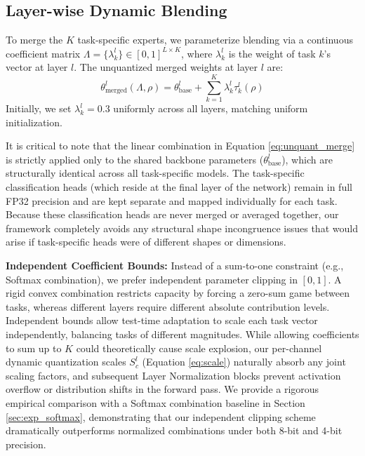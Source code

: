\subsection{Layer-wise Dynamic Blending}
To merge the $K$ task-specific experts, we parameterize blending via a continuous coefficient matrix $\Lambda = \{\lambda^l_k\} \in [0, 1]^{L \times K}$, where $\lambda^l_k$ is the weight of task $k$'s vector at layer $l$. The unquantized merged weights at layer $l$ are:
\begin{equation}
\label{eq:unquant_merge}
\theta^l_{\text{merged}}(\Lambda, \rho) = \theta^l_{\text{base}} + \sum_{k=1}^K \lambda^l_k \tau^l_k(\rho)
\end{equation}
Initially, we set $\lambda^l_k = 0.3$ uniformly across all layers, matching uniform initialization.

It is critical to note that the linear combination in Equation \ref{eq:unquant_merge} is strictly applied only to the shared backbone parameters ($\theta^l_{\text{base}}$), which are structurally identical across all task-specific models. The task-specific classification heads (which reside at the final layer of the network) remain in full FP32 precision and are kept separate and mapped individually for each task. Because these classification heads are never merged or averaged together, our framework completely avoids any structural shape incongruence issues that would arise if task-specific heads were of different shapes or dimensions.

\textbf{Independent Coefficient Bounds:}
Instead of a sum-to-one constraint (e.g., Softmax combination), we prefer independent parameter clipping in $[0, 1]$. A rigid convex combination restricts capacity by forcing a zero-sum game between tasks, whereas different layers require different absolute contribution levels. Independent bounds allow test-time adaptation to scale each task vector independently, balancing tasks of different magnitudes. While allowing coefficients to sum up to $K$ could theoretically cause scale explosion, our per-channel dynamic quantization scales $S^l_c$ (Equation \ref{eq:scale}) naturally absorb any joint scaling factors, and subsequent Layer Normalization blocks prevent activation overflow or distribution shifts in the forward pass. We provide a rigorous empirical comparison with a Softmax combination baseline in Section \ref{sec:exp_softmax}, demonstrating that our independent clipping scheme dramatically outperforms normalized combinations under both 8-bit and 4-bit precision.

